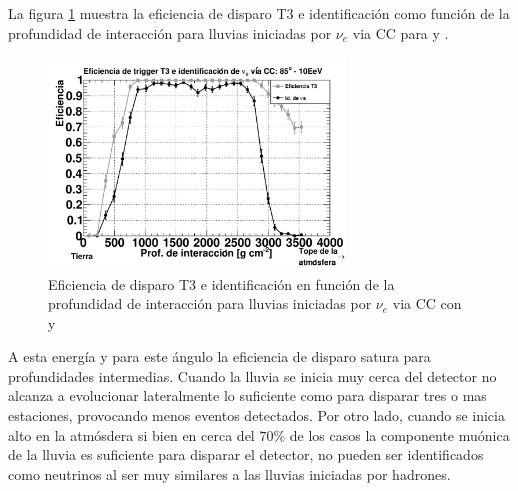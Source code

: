	La figura \ref{fig:effDG_tr_id} muestra la eficiencia de disparo T3 e identificación como función de la profundidad de interacción para lluvias iniciadas por $\nu_e$ via CC para  y .
	\begin{figure}[h!]
		\begin{center}
			\includegraphics[width=0.7\textwidth]{fig/resultadosAuger/eff_10EeV_85}
			\caption{Eficiencia de disparo T3 e identificación en función de la profundidad de interacción para lluvias iniciadas por $\nu_e$ via CC con  y }
			\label{fig:effDG_tr_id}
		\end{center}
	\end{figure} 
	A esta energía y para este ángulo la eficiencia de disparo satura para profundidades intermedias.
	Cuando la lluvia se inicia muy cerca del detector no alcanza a evolucionar lateralmente lo suficiente como para disparar tres o mas estaciones, provocando menos eventos detectados. 
	Por otro lado, cuando se inicia alto en la atmósdera si bien en cerca del $70\%$ de los casos la componente muónica de la lluvia es suficiente para disparar el detector, no pueden ser identificados como neutrinos al ser muy similares a las lluvias iniciadas por hadrones.
	
